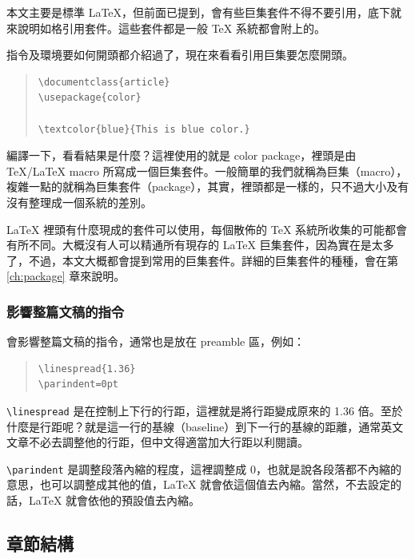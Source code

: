 本文主要是標準 \LaTeX{}，但前面已提到，會有些巨集套件不得不要引用，底下就來說明如格引用套件。這些套件都是一般 \TeX{} 系統都會附上的。

指令及環境要如何開頭都介紹過了，現在來看看引用巨集要怎麼開頭。

\begin{quote}
   \begin{verbatim}
\documentclass{article}
\usepackage{color}

\textcolor{blue}{This is blue color.}

\end{verbatim}
\end{quote}

編譯一下，看看結果是什麼？這裡使用的就是 \textsf{color} package，裡頭是由 \TeX{}/\LaTeX{} macro 所寫成一個巨集套件。一般簡單的我們就稱為巨集（macro），複雜一點的就稱為巨集套件（package），其實，裡頭都是一樣的，只不過大小及有沒有整理成一個系統的差別。

\LaTeX{} 裡頭有什麼現成的套件可以使用，每個散佈的 \TeX{} 系統所收集的可能都會有所不同。大概沒有人可以精通所有現存的 \LaTeX{} 巨集套件，因為實在是太多了，不過，本文大概都會提到常用的巨集套件。詳細的巨集套件的種種，會在第 \ref{ch:package} 章來說明。

\subsubsection{影響整篇文稿的指令}

會影響整篇文稿的指令，通常也是放在 preamble 區，例如：

\begin{quote}
   \begin{verbatim}
\linespread{1.36}
\parindent=0pt
\end{verbatim}
\end{quote}

\verb|\linespread| 是在控制上下行的行距，這裡就是將行距變成原來的 1.36 倍。至於什麼是行距呢？就是這一行的基線（baseline）到下一行的基線的距離，通常英文文章不必去調整他的行距，但中文得適當加大行距以利閱讀。

\verb|\parindent| 是調整段落內縮的程度，這裡調整成 0，也就是說各段落都不內縮的意思，也可以調整成其他的值，\LaTeX{} 就會依這個值去內縮。當然，不去設定的話，\LaTeX{} 就會依他的預設值去內縮。

\subsection{章節結構}
\label{subsec:chapstruc}

